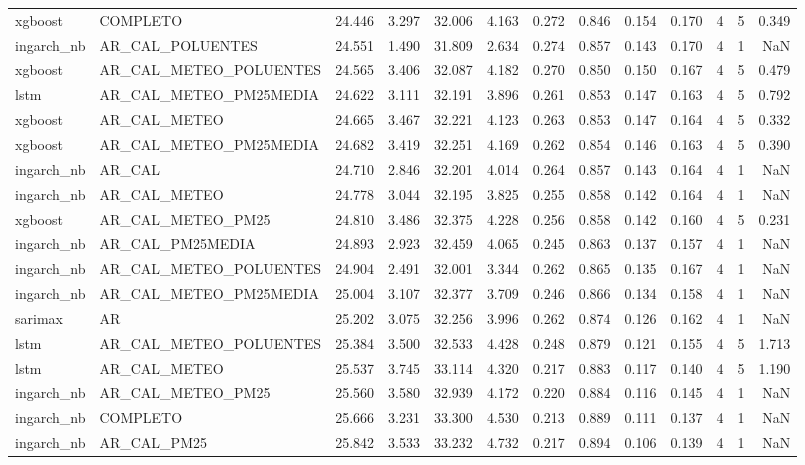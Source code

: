 \begin{tabular}{llrrrrrrrrrrr}
xgboost & COMPLETO & 24.446 & 3.297 & 32.006 & 4.163 & 0.272 & 0.846 & 0.154 & 0.170 & 4 & 5 & 0.349 \\
ingarch_nb & AR_CAL_POLUENTES & 24.551 & 1.490 & 31.809 & 2.634 & 0.274 & 0.857 & 0.143 & 0.170 & 4 & 1 & NaN \\
xgboost & AR_CAL_METEO_POLUENTES & 24.565 & 3.406 & 32.087 & 4.182 & 0.270 & 0.850 & 0.150 & 0.167 & 4 & 5 & 0.479 \\
lstm & AR_CAL_METEO_PM25MEDIA & 24.622 & 3.111 & 32.191 & 3.896 & 0.261 & 0.853 & 0.147 & 0.163 & 4 & 5 & 0.792 \\
xgboost & AR_CAL_METEO & 24.665 & 3.467 & 32.221 & 4.123 & 0.263 & 0.853 & 0.147 & 0.164 & 4 & 5 & 0.332 \\
xgboost & AR_CAL_METEO_PM25MEDIA & 24.682 & 3.419 & 32.251 & 4.169 & 0.262 & 0.854 & 0.146 & 0.163 & 4 & 5 & 0.390 \\
ingarch_nb & AR_CAL & 24.710 & 2.846 & 32.201 & 4.014 & 0.264 & 0.857 & 0.143 & 0.164 & 4 & 1 & NaN \\
ingarch_nb & AR_CAL_METEO & 24.778 & 3.044 & 32.195 & 3.825 & 0.255 & 0.858 & 0.142 & 0.164 & 4 & 1 & NaN \\
xgboost & AR_CAL_METEO_PM25 & 24.810 & 3.486 & 32.375 & 4.228 & 0.256 & 0.858 & 0.142 & 0.160 & 4 & 5 & 0.231 \\
ingarch_nb & AR_CAL_PM25MEDIA & 24.893 & 2.923 & 32.459 & 4.065 & 0.245 & 0.863 & 0.137 & 0.157 & 4 & 1 & NaN \\
ingarch_nb & AR_CAL_METEO_POLUENTES & 24.904 & 2.491 & 32.001 & 3.344 & 0.262 & 0.865 & 0.135 & 0.167 & 4 & 1 & NaN \\
ingarch_nb & AR_CAL_METEO_PM25MEDIA & 25.004 & 3.107 & 32.377 & 3.709 & 0.246 & 0.866 & 0.134 & 0.158 & 4 & 1 & NaN \\
sarimax & AR & 25.202 & 3.075 & 32.256 & 3.996 & 0.262 & 0.874 & 0.126 & 0.162 & 4 & 1 & NaN \\
lstm & AR_CAL_METEO_POLUENTES & 25.384 & 3.500 & 32.533 & 4.428 & 0.248 & 0.879 & 0.121 & 0.155 & 4 & 5 & 1.713 \\
lstm & AR_CAL_METEO & 25.537 & 3.745 & 33.114 & 4.320 & 0.217 & 0.883 & 0.117 & 0.140 & 4 & 5 & 1.190 \\
ingarch_nb & AR_CAL_METEO_PM25 & 25.560 & 3.580 & 32.939 & 4.172 & 0.220 & 0.884 & 0.116 & 0.145 & 4 & 1 & NaN \\
ingarch_nb & COMPLETO & 25.666 & 3.231 & 33.300 & 4.530 & 0.213 & 0.889 & 0.111 & 0.137 & 4 & 1 & NaN \\
ingarch_nb & AR_CAL_PM25 & 25.842 & 3.533 & 33.232 & 4.732 & 0.217 & 0.894 & 0.106 & 0.139 & 4 & 1 & NaN \\

\end{tabular}
